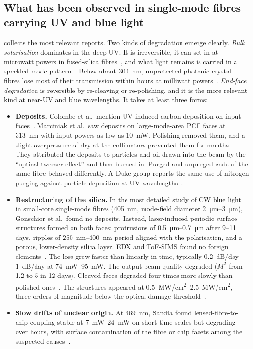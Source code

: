\subsection{What has been observed in single-mode fibres carrying UV and blue light}\label{sec:sota-reports}
 collects the most relevant reports. Two kinds of degradation emerge clearly.
\emph{Bulk solarisation} dominates in the deep UV. It is irreversible, it can set in at microwatt powers
in fused-silica fibres~\cite{Colombe2014}, and what light remains is carried in a speckled mode
pattern~\cite{Marciniak2017}. Below about \SI{300}{nm}, unprotected photonic-crystal fibres lose most of
their transmission within hours at milliwatt powers~\cite{Colombe2014,Gebert2014}. \emph{End-face
degradation} is reversible by re-cleaving or re-polishing, and it is the more relevant kind at near-UV and
blue wavelengths. It takes at least three forms:
\begin{itemize}
  \item \textbf{Deposits.} Colombe et al.\ mention UV-induced carbon deposition on input
        faces~\cite{Colombe2014}. Marciniak et al.\ saw deposits on large-mode-area PCF faces at
        \SI{313}{nm} with input powers as low as \SI{10}{mW}. Polishing removed them, and a slight
        overpressure of dry \Ntwo{} at the collimators prevented them for months~\cite{Marciniak2017}. They
        attributed the deposits to particles and oil drawn into the beam by the ``optical-tweezer effect''
        and then burned in. Purged and unpurged ends of the same fibre behaved differently. A Duke group
        reports the same use of nitrogen purging against particle deposition at UV
        wavelengths~\cite{YuJ2026}.
  \item \textbf{Restructuring of the silica.} In the most detailed study of CW blue light in small-core
        single-mode fibres (\SI{405}{nm}, mode-field diameter \SIrange{2}{3}{\micro m}), Gonschior et al.\
        found no deposits. Instead, laser-induced periodic surface structures formed on both faces:
        protrusions of \SIrange{0.5}{0.7}{\micro m} after 9--11 days, ripples of \SIrange{250}{400}{nm}
        period aligned with the polarisation, and a porous, lower-density silica layer. EDX and ToF-SIMS
        found no foreign elements~\cite{Gonschior2013JNCS,Gonschior2013PhD}. The loss grew faster than
        linearly in time, typically \SIrange{0.2}{1}{dB/day} at \SIrange{74}{95}{mW}. The output beam
        quality degraded ($M^2$ from 1.2 to 5 in 12 days). Cleaved faces degraded four times more slowly
        than polished ones~\cite{Gonschior2013PhD,Gonschior2014OE}. The structures appeared at
        \SIrange{0.5}{2.5}{MW/cm^2}, three orders of magnitude below the optical damage
        threshold~\cite{Gonschior2013JNCS}.
  \item \textbf{Slow drifts of unclear origin.} At \SI{369}{nm}, Sandia found lensed-fibre-to-chip coupling stable at
        \SIrange{7}{24}{mW} on short time scales but degrading over hours, with surface contamination of
        the fibre or chip facets among the suspected causes~\cite{Kwon2024}.
\end{itemize}

